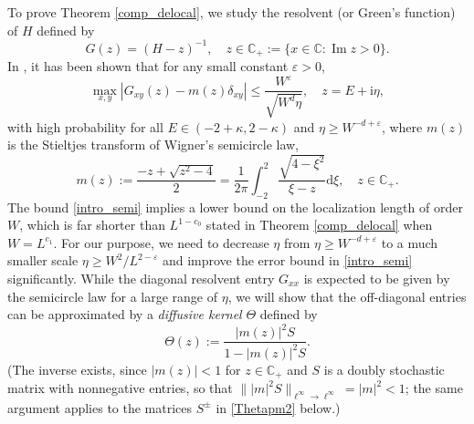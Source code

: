 \documentclass{article}
\makeatletter
\newcommand{\1}{\mathds{1}}
\numberwithin{equation}{section}
\newcommand{\be}{\begin{equation}}
\newcommand{\ee}{\end{equation}}
\newcommand{\e}{{\varepsilon}}
\newcommand{\ii}{\mathrm{i}} %
\newcommand{\dd}{\mathrm{d}}
\renewcommand{\leq}{\leqslant}
\renewcommand{\geq}{\geqslant}
\renewcommand{\le}{\leq}
\renewcommand{\ge}{\geq}
\newcommand{\C}{\mathbb{C}}
\newcommand{\Z}{\mathbb{Z}}
\DeclareMathOperator{\im}{Im}
\theoremstyle{plain} %
\theoremstyle{remark}
\newcommand{\cor}{\color{red}}
\renewcommand{\subsection}{\@startsection
{subsection}%
{2}%
{0mm}%
{-\baselineskip}%
{0.5\baselineskip}%
{\normalfont\bf\itshape}} %
\newcommand{\hty}[1]{{\cor (ht: #1) }}
\makeatother
\begin{document}
To prove Theorem \ref{comp_delocal}, we study the resolvent (or Green's function) of $H$ defined by 
\be\nonumber
G(z)=(H-z)^{-1},\quad z\in \C_+:=\{x\in \C: \im z>0\}.
\ee
In \cite{Semicircle, ErdYauYin2012Univ}, it has been shown that for any small constant $\e>0$,
\be  \label{intro_semi}
\max_{x,y}|G_{xy}(z)-m(z)\delta_{xy}| \le \frac{W^\e}{\sqrt{W^d \eta}} ,\quad z= E+ \ii \eta,
\ee
with high probability for all $E\in (-2+\kappa,2-\kappa)$ and $\eta\ge W^{-d + \e}$, where $m(z)$ is the Stieltjes transform of Wigner's semicircle law,
\be\label{msc}
m(z):=\frac{-z+\sqrt{z^2-4}}{2} = \frac{1}{2\pi}\int_{-2}^2 \frac{\sqrt{4-\xi^2}}{\xi-z}\dd\xi,\quad z\in \C_+.
\ee
The bound \eqref{intro_semi} implies a lower bound on the localization length of order $W$, which is far shorter than $L^{1 - c_0}$ 
stated in Theorem \ref{comp_delocal} when $W = L^{c_1}$. For our purpose, we need to decrease $\eta$ from $\eta\ge W^{-d + \e}$
to a much smaller scale $\eta \ge W^{2}/L^{2-\e}$ and improve the error bound in \eqref{intro_semi} significantly. 
%
While the diagonal resolvent entry $G_{xx}$ is expected to be given by the semicircle law for a large range of $\eta$, we will show that the off-diagonal entries can be approximated by a \emph{diffusive kernel} $\Theta$ defined by  %
\be\label{Thetapm}
\Theta(z):=\frac{|m(z)|^2 S}{1-|m(z)|^2 S} .
\ee
(The inverse exists, since $|m(z)|<1$ for $z\in \C_+$ and $S$ is a doubly stochastic matrix with nonnegative entries, so that $\||m|^2 S\|_{\ell^\infty\to \ell^\infty}=|m|^2<1$; the same argument applies to the matrices $S^\pm$ in \eqref{Thetapm2} below.)
\end{document}
